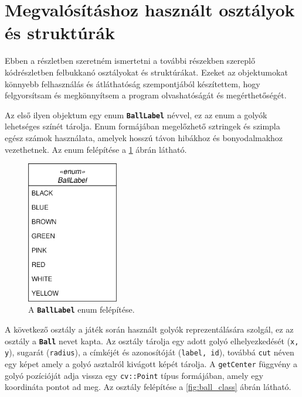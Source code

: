 \section{Megvalósításhoz használt osztályok és struktúrák}
\label{section:classes_and_structs}
Ebben a részletben szeretném ismertetni a további részekben szereplő kódrészletben felbukkanó osztályokat és struktúrákat. Ezeket az objektumokat könnyebb felhasználás és átláthatóság szempontjából készítettem, hogy felgyorsítsam és megkönnyítsem a program olvashatóságát és megérthetőségét.
\par Az első ilyen objektum egy enum \textbf{\lstinline{BallLabel}} névvel, ez az enum a golyók lehetséges színét tárolja. Enum formájában megelőzhető sztringek és szimpla egész számok használata, amelyek hosszú távon hibákhoz és bonyodalmakhoz vezethetnek. Az enum felépítése a \ref{fig:balllabel_enum} ábrán látható.

\begin{figure}[!ht]
    \centering
    \includegraphics[width=40mm, keepaspectratio]{figures/balllabel_enum.png}
    \caption{A \textbf{\lstinline{BallLabel}} enum felépítése.}
    \label{fig:balllabel_enum}
\end{figure}

\par A következő osztály a játék során használt golyók reprezentálására szolgál, ez az osztály a \textbf{\lstinline{Ball}} nevet kapta. Az osztály tárolja egy adott golyó elhelyezkedését (\lstinline{x, y}), sugarát (\lstinline{radius}), a címkéjét és azonosítóját (\lstinline{label, id}), továbbá \lstinline{cut} néven egy képet amely a golyó asztalról kivágott képét tárolja. A \lstinline{getCenter} függvény a golyó pozícióját adja vissza egy \lstinline{cv::Point} típus\cite{opencv_docs} formájában, amely egy koordináta pontot ad meg. Az osztály felépítése a \ref{fig:ball_class} ábrán látható.

